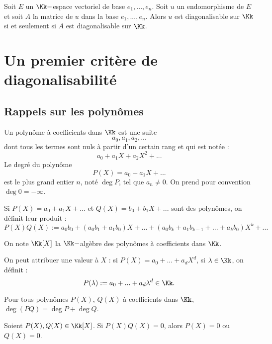 \documentclass[class=report,crop=false]{standalone}
\begin{document}
\begin{proposition}
Soit $E$ un $\Kk-$espace vectoriel de base $e_1,...,e_n$. Soit $u$ un endomorphisme de $E$ et soit $A$ la matrice de $u$ dans la base $e_1,...,e_n$. Alors $u$ est diagonalisable sur $\Kk$ si et seulement si $A$ est diagonalisable sur $\Kk$. 
\end{proposition}


\section{Un premier critère de diagonalisabilité}

\subsection*{Rappels sur les polynômes}

\begin{definition}
Un polynôme à coefficients dans $\Kk$ est une suite 
\[a_0,a_1,a_2,...\]
dont tous les termes sont nuls à partir d'un certain rang et qui est notée :
\[a_0 + a_1X + a_2X^2 + ...\]
Le degré du polynôme
\[P(X) = a_0 + a_1 X + ...\]
est le plus grand entier $n$, noté $\deg P$, tel que $a_n \neq 0$. On prend pour convention $\deg   0 = -\infty$.

Si $P(X) = a_0 + a_1 X + ...$ et $Q(X) = b_0 + b_1 X + ...$ sont des polynômes, on définit leur produit :
\[P(X) Q(X) := a_0b_0 + (a_0 b_1 + a_1b_0) X + ... + (a_0b_k + a_1 b_{k-1} + ... + a_k b_0)X^k + ...\]

On note $\Kk[X]$ la $\Kk-$algèbre des polynômes à coefficients dans $\Kk$.
\end{definition}

\begin{remarque*}[importante]
On peut attribuer une valeur à $X$ : 
si $P(X) = a_0 +...+ a_d X^d$, si $\lambda \in \Kk$, on définit :
\[P(\lambda):= a_0 + ... +a_d\lambda^d \in \Kk .\]

\end{remarque*}

\begin{remarque*}
Pour tous polynômes $P(X)$, $Q(X)$ à coefficients dans $\Kk$, $\deg (PQ) = \deg P + \deg Q$.
\end{remarque*}

\begin{proposition}[intégrité]

Soient $P(X),Q(X) \in \Kk[X]$. Si $P(X) Q(X) = 0$, alors $P(X)=0$ ou $Q(X) =0$.
\end{proposition}
\end{document}
